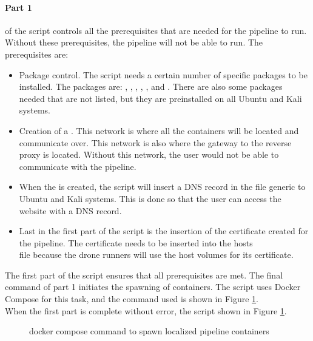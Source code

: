 \paragraph{Part 1} of the script controls all the prerequisites that are needed for the pipeline to run. Without 
these prerequisites, the pipeline will not be able to run. The prerequisites are:
\begin{itemize}
    \item Package control. The script needs a certain number of specific packages to be installed. The packages are: ,
    , , , , and . There are also some packages needed that are not listed, 
    but they are preinstalled on all Ubuntu\cite{ubuntu} and Kali\cite{kali} systems.
    \item Creation of a . This network is where all the containers will be located and communicate over.
    This network is also where the gateway to the reverse proxy is located. Without this network, the user would not be able to communicate with the pipeline.
    \item When the  is created, the script will insert a \ac{DNS} record in the 
     file generic to Ubuntu and Kali systems. This is done so that the user can access the website with a \ac{DNS} record.
    \item Last in the first part of the script is the insertion of the certificate created for 
    the pipeline. The certificate needs to be inserted into the hosts\\
     file because the drone runners will use the host volumes for its certificate.
\end{itemize}
The first part of the script ensures that all prerequisites are met. The final command of part 1 initiates the spawning of containers. 
The script uses Docker Compose for this task, and the command used is shown in Figure \ref{fig:docker-compose-localized}.\\
When the first part is complete without error, the script shown in Figure \ref{fig:docker-compose-localized}.
\begin{figure}[h]
    \begin{center}
    \end{center}
    \caption{docker compose command to spawn localized pipeline containers}
    \label{fig:docker-compose-localized}
\end{figure}


